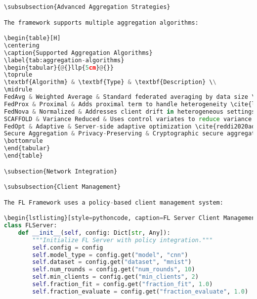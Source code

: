 \begin{lstlisting}[language=Python, caption=Training Loop with Loss Tracking]
\subsubsection{Advanced Aggregation Strategies}

The framework supports multiple aggregation algorithms:

\begin{table}[H]
\centering
\caption{Supported Aggregation Algorithms}
\label{tab:aggregation-algorithms}
\begin{tabular}{@{}llp{5cm}@{}}
\toprule
\textbf{Algorithm} & \textbf{Type} & \textbf{Description} \\
\midrule
FedAvg & Weighted Average & Standard federated averaging by data size \cite{mcmahan2017communication} \\
FedProx & Proximal & Adds proximal term to handle heterogeneity \cite{li2020fedprox} \\
FedNova & Normalized & Addresses client drift in heterogeneous settings \cite{wang2020fednova} \\
SCAFFOLD & Variance Reduced & Uses control variates to reduce variance \cite{karimireddy2020scaffold} \\
FedOpt & Adaptive & Server-side adaptive optimization \cite{reddi2020adaptive} \\
Secure Aggregation & Privacy-Preserving & Cryptographic secure aggregation \\
\bottomrule
\end{tabular}
\end{table}

\subsection{Network Integration}

\subsubsection{Client Management}

The FL Framework uses a policy-based client management system:

\begin{lstlisting}[style=pythoncode, caption=FL Server Client Management]
class FLServer:
    def __init__(self, config: Dict[str, Any]):
        """Initialize FL Server with policy integration."""
        self.config = config
        self.model_type = config.get("model", "cnn")
        self.dataset = config.get("dataset", "mnist") 
        self.num_rounds = config.get("num_rounds", 10)
        self.min_clients = config.get("min_clients", 2)
        self.fraction_fit = config.get("fraction_fit", 1.0)
        self.fraction_evaluate = config.get("fraction_evaluate", 1.0)
        

\end{lstlisting}
